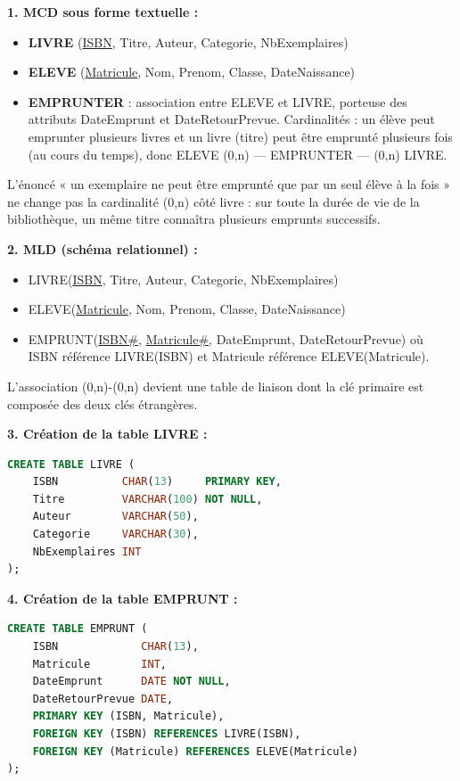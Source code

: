 \documentclass[11pt]{article}
\begin{document}
\begin{corrige}
\textbf{1. MCD sous forme textuelle :}
\begin{itemize}
    \item \textbf{LIVRE} (\underline{ISBN}, Titre, Auteur, Categorie, NbExemplaires)
    \item \textbf{ELEVE} (\underline{Matricule}, Nom, Prenom, Classe, DateNaissance)
    \item \textbf{EMPRUNTER} : association entre ELEVE et LIVRE, porteuse des attributs DateEmprunt et DateRetourPrevue. Cardinalités : un élève peut emprunter plusieurs livres et un livre (titre) peut être emprunté plusieurs fois (au cours du temps), donc ELEVE (0,n) --- EMPRUNTER --- (0,n) LIVRE.
\end{itemize}
L'énoncé « un exemplaire ne peut être emprunté que par un seul élève à la fois » ne change pas la cardinalité (0,n) côté livre : sur toute la durée de vie de la bibliothèque, un même titre connaîtra plusieurs emprunts successifs.

\textbf{2. MLD (schéma relationnel) :}
\begin{itemize}
    \item LIVRE(\underline{ISBN}, Titre, Auteur, Categorie, NbExemplaires)
    \item ELEVE(\underline{Matricule}, Nom, Prenom, Classe, DateNaissance)
    \item EMPRUNT(\underline{ISBN\#}, \underline{Matricule\#}, DateEmprunt, DateRetourPrevue) où ISBN référence LIVRE(ISBN) et Matricule référence ELEVE(Matricule).
\end{itemize}
L'association (0,n)-(0,n) devient une table de liaison dont la clé primaire est composée des deux clés étrangères.

\textbf{3. Création de la table LIVRE :}
\begin{lstlisting}[language=SQL]
CREATE TABLE LIVRE (
    ISBN          CHAR(13)     PRIMARY KEY,
    Titre         VARCHAR(100) NOT NULL,
    Auteur        VARCHAR(50),
    Categorie     VARCHAR(30),
    NbExemplaires INT
);
\end{lstlisting}

\textbf{4. Création de la table EMPRUNT :}
\begin{lstlisting}[language=SQL]
CREATE TABLE EMPRUNT (
    ISBN             CHAR(13),
    Matricule        INT,
    DateEmprunt      DATE NOT NULL,
    DateRetourPrevue DATE,
    PRIMARY KEY (ISBN, Matricule),
    FOREIGN KEY (ISBN) REFERENCES LIVRE(ISBN),
    FOREIGN KEY (Matricule) REFERENCES ELEVE(Matricule)
);
\end{lstlisting}


\end{corrige}
\end{document}
